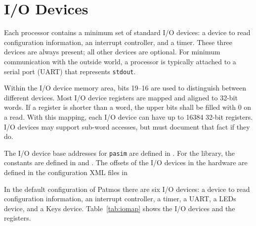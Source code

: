 \documentclass[a4paper,fontsize=10pt,twoside,DIV15,BCOR12mm,headinclude=true,footinclude=false,pagesize,bibtotoc]{scrbook}
\newcommand{\code}[1]{{\texttt{#1}}}
\begin{document}
\section{I/O Devices}
\label{sec:iodevs}

Each processor contains a minimum set of standard I/O devices: a
device to read configuration information, an interrupt controller, and
a timer. These three devices are always present; all other devices are
optional. For minimum communication with the outside world, a
processor is typically attached to a serial port (UART) that
represents \code{stdout}.

Within the I/O device memory area, bits 19--16 are used to distinguish
between different devices. Most I/O device registers are mapped and
aligned to 32-bit words. If a register is shorter than a word, the
upper bits shall be filled with 0 on a read. With this mapping, each
I/O device can have up to 16384 32-bit registers. I/O devices may
support sub-word accesses, but must document that fact if they do.

The I/O device base addresses for \code{pasim} are defined in
. For the library, the
constants are defined in  and
. The offsets of
the I/O devices in the hardware are defined in the configuration XML
files in 

In the default configuration of Patmos there are six I/O devices: a
device to read configuration information, an interrupt controller, a
timer, a UART, a LEDs device, and a Keys device. Table~\ref{tab:iomap}
shows the I/O devices and the registers.
\end{document}
